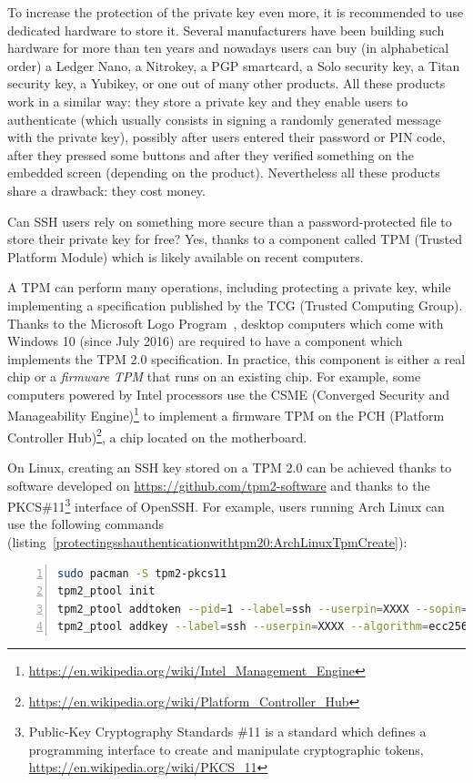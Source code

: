 To increase the protection of the private key even more, it is
recommended to use dedicated hardware to store it. Several manufacturers
have been building such hardware for more than ten years and nowadays
users can buy (in alphabetical order) a Ledger Nano, a Nitrokey, a PGP
smartcard, a Solo security key, a Titan security key, a Yubikey, or one
out of many other products. All these products work in a similar way:
they store a private key and they enable users to authenticate (which
usually consists in signing a randomly generated message with the
private key), possibly after users entered their password or PIN code,
after they pressed some buttons and after they verified something on the
embedded screen (depending on the product). Nevertheless all these
products share a drawback: they cost money.

Can SSH users rely on something more secure than a password-protected
file to store their private key for free? Yes, thanks to a component
called TPM (Trusted Platform Module) which is likely available on recent
computers.

A TPM can perform many operations, including protecting a private key,
while implementing a specification published by the TCG (Trusted
Computing Group). Thanks to the Microsoft Logo
Program~\cite{protectingsshauthenticationwithtpm20:mslogo}, desktop
computers which come with Windows 10 (since July 2016) are required to
have a component which implements the TPM 2.0 specification. In
practice, this component is either a real chip or a \emph{firmware TPM}
that runs on an existing chip. For example, some computers powered by
Intel processors use the CSME (Converged Security and Manageability
Engine)\footnote{\url{https://en.wikipedia.org/wiki/Intel_Management_Engine}}
to implement a firmware TPM on the PCH (Platform Controller
Hub)\footnote{\url{https://en.wikipedia.org/wiki/Platform_Controller_Hub}},
a chip located on the motherboard.

On Linux, creating an SSH key stored on a TPM 2.0 can be achieved thanks
to software developed on \url{https://github.com/tpm2-software} and
thanks to the PKCS\#11\footnote{Public-Key Cryptography Standards \#11
  is a standard which defines a programming interface to create and
  manipulate cryptographic tokens,
  \url{https://en.wikipedia.org/wiki/PKCS_11}} interface of OpenSSH. For
example, users running Arch Linux can use the following commands
(listing~\ref{protectingsshauthenticationwithtpm20:ArchLinuxTpmCreate}):

\begin{lstlisting}[language=sh, numbers=left, caption={Commands to create a key stored on a TPM, for Arch Linux users}, label=protectingsshauthenticationwithtpm20:ArchLinuxTpmCreate]
sudo pacman -S tpm2-pkcs11
tpm2_ptool init
tpm2_ptool addtoken --pid=1 --label=ssh --userpin=XXXX --sopin=YYYY
tpm2_ptool addkey --label=ssh --userpin=XXXX --algorithm=ecc256
\end{lstlisting}


